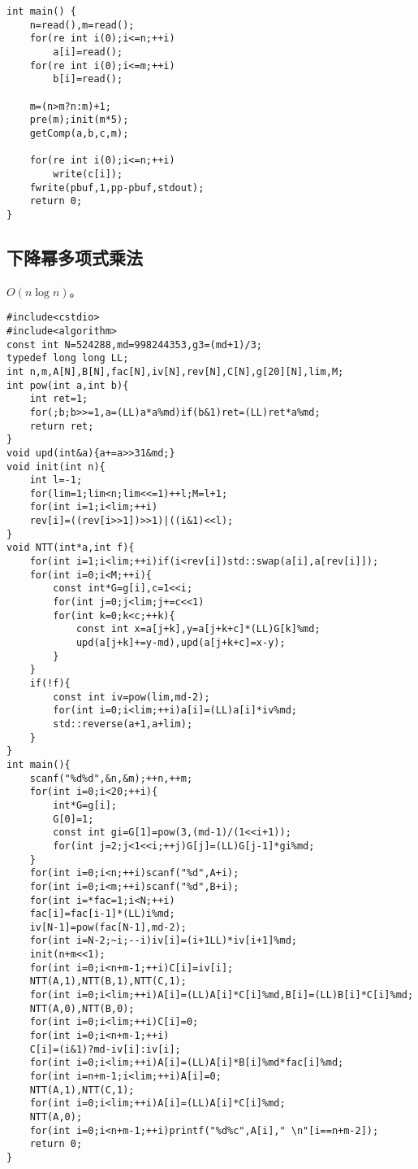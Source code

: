 \documentclass[12pt]{ctexart}
\begin{document}
\begin{lstlisting}
int main() {
    n=read(),m=read();
    for(re int i(0);i<=n;++i)
        a[i]=read();
    for(re int i(0);i<=m;++i)
        b[i]=read();
    
    m=(n>m?n:m)+1;
    pre(m);init(m*5);
    getComp(a,b,c,m);
    
    for(re int i(0);i<=n;++i)
        write(c[i]);
    fwrite(pbuf,1,pp-pbuf,stdout);
    return 0;
}
\end{lstlisting}

\subsection{下降幂多项式乘法}

$O(n\log n)$。

\begin{lstlisting}
#include<cstdio>
#include<algorithm>
const int N=524288,md=998244353,g3=(md+1)/3;
typedef long long LL;
int n,m,A[N],B[N],fac[N],iv[N],rev[N],C[N],g[20][N],lim,M;
int pow(int a,int b){
    int ret=1;
    for(;b;b>>=1,a=(LL)a*a%md)if(b&1)ret=(LL)ret*a%md;
    return ret;
}
void upd(int&a){a+=a>>31&md;}
void init(int n){
    int l=-1;
    for(lim=1;lim<n;lim<<=1)++l;M=l+1;
    for(int i=1;i<lim;++i)
    rev[i]=((rev[i>>1])>>1)|((i&1)<<l);
}
void NTT(int*a,int f){
    for(int i=1;i<lim;++i)if(i<rev[i])std::swap(a[i],a[rev[i]]);
    for(int i=0;i<M;++i){
        const int*G=g[i],c=1<<i;
        for(int j=0;j<lim;j+=c<<1)
        for(int k=0;k<c;++k){
            const int x=a[j+k],y=a[j+k+c]*(LL)G[k]%md;
            upd(a[j+k]+=y-md),upd(a[j+k+c]=x-y);
        }
    }
    if(!f){
        const int iv=pow(lim,md-2);
        for(int i=0;i<lim;++i)a[i]=(LL)a[i]*iv%md;
        std::reverse(a+1,a+lim);
    }
}
int main(){
    scanf("%d%d",&n,&m);++n,++m;
    for(int i=0;i<20;++i){
        int*G=g[i];
        G[0]=1;
        const int gi=G[1]=pow(3,(md-1)/(1<<i+1));
        for(int j=2;j<1<<i;++j)G[j]=(LL)G[j-1]*gi%md;
    }
    for(int i=0;i<n;++i)scanf("%d",A+i);
    for(int i=0;i<m;++i)scanf("%d",B+i);
    for(int i=*fac=1;i<N;++i)
    fac[i]=fac[i-1]*(LL)i%md;
    iv[N-1]=pow(fac[N-1],md-2);
    for(int i=N-2;~i;--i)iv[i]=(i+1LL)*iv[i+1]%md;
    init(n+m<<1);
    for(int i=0;i<n+m-1;++i)C[i]=iv[i];
    NTT(A,1),NTT(B,1),NTT(C,1);
    for(int i=0;i<lim;++i)A[i]=(LL)A[i]*C[i]%md,B[i]=(LL)B[i]*C[i]%md;
    NTT(A,0),NTT(B,0);
    for(int i=0;i<lim;++i)C[i]=0;
    for(int i=0;i<n+m-1;++i)
    C[i]=(i&1)?md-iv[i]:iv[i];
    for(int i=0;i<lim;++i)A[i]=(LL)A[i]*B[i]%md*fac[i]%md;
    for(int i=n+m-1;i<lim;++i)A[i]=0;
    NTT(A,1),NTT(C,1);
    for(int i=0;i<lim;++i)A[i]=(LL)A[i]*C[i]%md;
    NTT(A,0);
    for(int i=0;i<n+m-1;++i)printf("%d%c",A[i]," \n"[i==n+m-2]);
    return 0;
}
\end{lstlisting}
\end{document}
